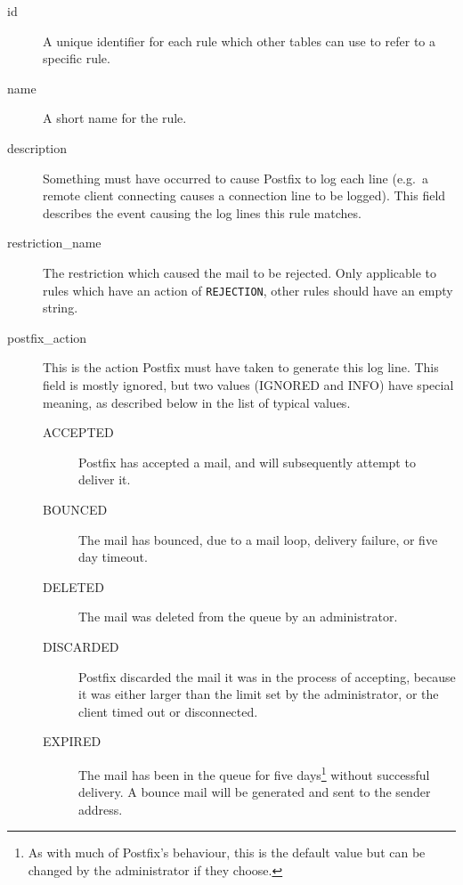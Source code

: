 \begin{description}

    \item [id] A unique identifier for each rule which other tables can use
        to refer to a specific rule.

    \item [name] A short name for the rule.

    \item [description] Something must have occurred to cause Postfix to
        log each line (e.g.\ a remote client connecting causes a connection
        line to be logged).  This field describes the event causing the log
        lines this rule matches.

    \item [restriction\_name] The restriction which caused the mail to be
        rejected.  Only applicable to rules which have an action of
        \texttt{REJECTION}, other rules should have an empty string.

    \item [postfix\_action] This is the action Postfix must have taken to
        generate this log line.  This field is mostly ignored, but two
        values (IGNORED and INFO) have special meaning, as described below
        in the list of typical values.\label{postfix_action}

        \begin{description}

            \item [ACCEPTED] Postfix has accepted a mail, and will
                subsequently attempt to deliver it.

            \item [BOUNCED] The mail has bounced, due to a mail loop,
                delivery failure, or five day timeout.

            \item [DELETED] The mail was deleted from the queue by an
                administrator.

            \item [DISCARDED] Postfix discarded the mail it was in the
                process of accepting, because it was either larger than the
                limit set by the administrator, or the client timed out or
                disconnected.

            \item [EXPIRED] The mail has been in the queue for five
                days\footnote{As with much of Postfix's behaviour, this is
                the default value but can be changed by the administrator
                if they choose.} without successful delivery.  A bounce
                mail will be generated and sent to the sender address.


\end{description}
\end{description}
